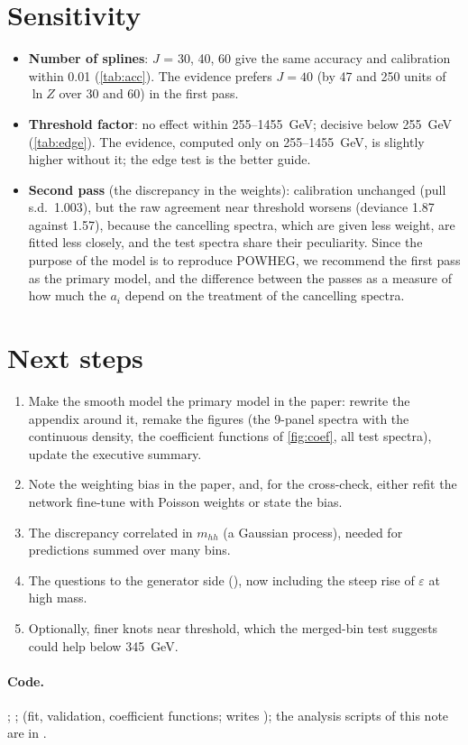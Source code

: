 \section{Sensitivity}

\begin{itemize}
  \item \textbf{Number of splines}: $J$ = 30, 40, 60 give the same accuracy and calibration
    within 0.01 (\cref{tab:acc}). The evidence prefers $J = 40$ (by 47 and 250 units of
    $\ln Z$ over 30 and 60) in the first pass.
  \item \textbf{Threshold factor}: no effect within 255--1455~GeV; decisive below 255~GeV
    (\cref{tab:edge}). The evidence, computed only on 255--1455~GeV, is slightly higher without
    it; the edge test is the better guide.
  \item \textbf{Second pass} (the discrepancy in the weights): calibration unchanged (pull s.d.\
    1.003), but the raw agreement near threshold worsens (deviance 1.87 against 1.57), because the
    cancelling spectra, which are given less weight, are fitted less closely, and the test
    spectra share their peculiarity. Since the purpose of the model is to reproduce POWHEG, we
    recommend the first pass as the primary model, and the difference between the passes as a
    measure of how much the $a_i$ depend on the treatment of the cancelling spectra.
\end{itemize}

\section{Next steps}

\begin{enumerate}
  \item Make the smooth model the primary model in the paper: rewrite the appendix around it,
    remake the figures (the 9-panel spectra with the continuous density, the coefficient
    functions of \cref{fig:coef}, all test spectra), update the executive summary.
  \item Note the weighting bias in the paper, and, for the cross-check, either refit the network
    fine-tune with Poisson weights or state the bias.
  \item The discrepancy correlated in $m_{hh}$ (a Gaussian process), needed for predictions summed
    over many bins.
  \item The questions to the generator side (),
    now including the steep rise of $\varepsilon$ at high mass.
  \item Optionally, finer knots near threshold, which the merged-bin test suggests could help
    below 345~GeV.
\end{enumerate}

\paragraph{Code.} ; ; 
(fit, validation, coefficient functions; writes \file{runs/SMOOTH_J40/}); the analysis scripts of
this note are in \file{docs/smooth/scripts/}.


